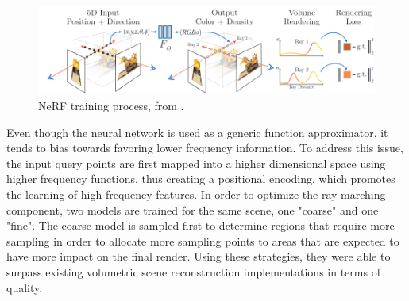 \begin{figure}[H]
    \centering
    \includegraphics[width=0.7\linewidth]{figures/nerf.png}
    \caption{NeRF training process, from \cite{mildenhall2020nerf}.}
    \label{fig:nerf}
\end{figure}

Even though the neural network is used as a generic function approximator, it tends to bias towards favoring lower frequency information. To address this issue, the input query points are first mapped into a higher dimensional space using higher frequency functions, thus creating a positional encoding, which promotes the learning of high-frequency features. In order to optimize the ray marching component, two models are trained for the same scene, one "coarse" and one "fine". The coarse model is sampled first to determine regions that require more sampling in order to allocate more sampling points to areas that are expected to have more impact on the final render. Using these strategies, they were able to surpass existing volumetric scene reconstruction implementations in terms of quality.

